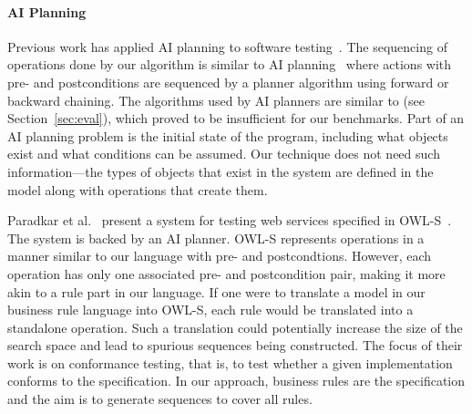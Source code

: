\paragraph*{AI Planning}Previous work has applied AI planning to software
testing~\cite{Scheetz99ai,Howe97testcase}. The sequencing of operations done by
our algorithm is similar to AI planning~\cite{Weld94} where actions with pre-
and postconditions are sequenced by a planner algorithm using forward or
backward chaining. The algorithms used by AI planners are similar to \exhaust{}
(see Section~\ref{sec:eval}), which proved to be insufficient for our
benchmarks. Part of an AI planning problem is the initial state of the program,
including what objects exist and what conditions can be assumed. Our technique
does not need such information---the types of objects that exist in the system
are defined in the model along with operations that create them.

Paradkar et al.~\cite{conf/icws/ParadkarSWJOSL07} present a system for testing
web services specified in OWL-S~\cite{owls}. The system is backed by an AI
planner. OWL-S represents operations in a manner similar to our language with
pre- and postcondtions. However, each operation has only one associated pre- and
postcondition pair, making it more akin to a rule part in our language. If one
were to translate a model in our business rule language into OWL-S, each rule
would be translated into a standalone operation. Such a translation could
potentially increase the size of the search space and lead to spurious sequences
being constructed. The focus of their work is on conformance testing, that is,
to test whether a given implementation conforms to the specification. In our
approach, business rules are the specification and the aim is to generate
sequences to cover all rules. %

